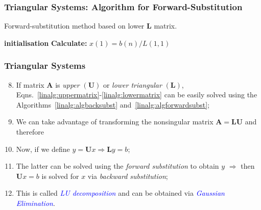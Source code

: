 \documentclass[10pt,compress,handout,ignorenonframetext]{beamer}
\begin{document}
\begin{frame}[fragile]
  \frametitle{Triangular Systems: Algorithm for Forward-Substitution} 
    \begin{algorithm}[H]\caption{Forward-substitution method based on lower $\bm{L}$ matrix.}
      {\bf initialisation}\;
      {\bf Calculate:} $x(1) = b(n) / L(1,1)$\;
        \label{linalg:algforwardsubst}
    \end{algorithm}
\end{frame}


\begin{frame}
  \frametitle{Triangular Systems} 
  \begin{enumerate}
  \setcounter{enumi}{7}
     \item <1-> If matrix $\bm{A}$ is {\it upper} $\left(\bm{U}\right)$ or {\it lower triangular} $\left(\bm{L}\right)$, Eqns.~\ref{linalg:uppermatrix}-\ref{linalg:lowermatrix} can be easily solved using the Algorithms~\ref{linalg:algbacksubst} and~\ref{linalg:algforwardsubst};
     \item <2-> We can take advantage of transforming the nonsingular matrix $\bm{A}=\bm{L}\bm{U}$ and therefore
     \item <3-> Now, if we define $y=\bm{U}x \Longrightarrow \bm{L}y=b$;
     \item <4-> The latter can be solved using the {\it forward substitution} to obtain $y$ $\Longrightarrow$ then $\bm{U}x=b$ is solved for $x$ via {\it backward substitution};
     \item <5-> This is called \textcolor{blue}{\it LU decomposition} and can be obtained via \textcolor{blue}{\it Gaussian Elimination}.
  \end{enumerate}
\end{frame}
\end{document}
